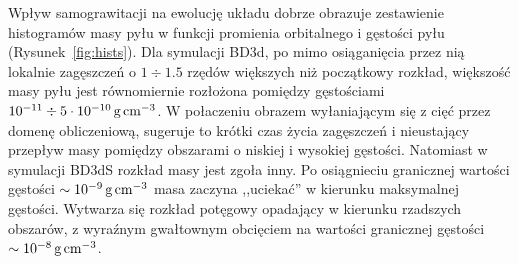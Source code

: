 %
\par Wpływ samograwitacji na ewolucję układu dobrze obrazuje zestawienie
histogramów masy pyłu w funkcji promienia orbitalnego i gęstości pyłu
(Rysunek~\ref{fig:hists}). Dla symulacji BD3d, po mimo osiąganięcia przez nią
lokalnie zagęszczeń o $1\div1.5$ rzędów większych niż początkowy rozkład,
większość masy pyłu jest równomiernie rozłożona pomiędzy gęstościami $10^{-11}
\div 5\cdot10^{-10}\hbox{$\thinspace\textrm{g}$}\hbox{$\thinspace\textrm{cm}$}^{-3}$. W połaczeniu obrazem wyłaniającym się z cięć
przez domenę obliczeniową, sugeruje to krótki czas życia zagęszczeń i
nieustający przepływ masy pomiędzy obszarami o niskiej i wysokiej gęstości.
Natomiast w symulacji BD3dS rozkład masy jest zgoła inny. Po osiągnieciu
granicznej wartości gęstości $\sim10^{-9}\hbox{$\thinspace\textrm{g}$}\hbox{$\thinspace\textrm{cm}$}^{-3}$ masa zaczyna ,,uciekać'' w
kierunku maksymalnej gęstości. Wytwarza się rozkład potęgowy opadający w
kierunku rzadszych obszarów, z wyraźnym gwałtownym obcięciem na wartości
granicznej gęstości $\sim10^{-8}\hbox{$\thinspace\textrm{g}$}\hbox{$\thinspace\textrm{cm}$}^{-3}$.
%
